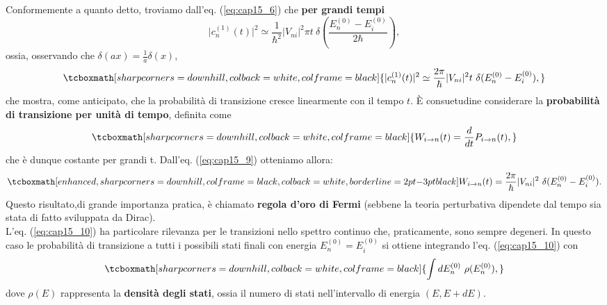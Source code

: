 Conformemente a quanto detto, troviamo dall'eq. (\ref{eq:cap15_6}) che \textbf{per grandi tempi}
	\begin{equation}
		\vert c_n ^{(1)} (t) \vert ^2 \simeq \frac{1}{\hbar ^2} \vert V_{ni} \vert ^2 \pi t\ \delta\left(\frac{E_n ^{(0)}-E_i ^{(0)}}{2\hbar} \right),
	\end{equation}
ossia, osservando che $\delta (ax) = \frac{1}{a} \delta (x)$,
	\begin{equation}
		\tcboxmath[sharp corners=downhill, colback=white, colframe=black]{
			\vert c_n ^{(1)} (t) \vert ^2 \simeq \frac{2\pi}{\hbar } \vert V_{ni} \vert ^2  t\ \delta (E_n ^{(0)}-E_i ^{(0)} ),
			}
	\label{eq:cap15_9}
	\end{equation}
che mostra, come anticipato, che la probabilità di transizione cresce linearmente con il tempo $t$. È consuetudine considerare la \textbf{probabilità di transizione per unità di tempo}, definita come
	\begin{equation}
		\tcboxmath[sharp corners=downhill, colback=white, colframe=black]{
			W_{i\rightarrow n} (t) =\frac{d}{dt} P_{i\rightarrow n} (t),
			}
	\end{equation}
che è dunque costante per grandi t. Dall'eq. (\ref{eq:cap15_9}) otteniamo allora:
	\begin{equation}
		\tcboxmath[enhanced, sharp corners=downhill, colframe=black, colback=white, borderline={2pt}{-3pt}{black}]{
			W_{i\rightarrow n} (t) = \frac{2\pi}{\hbar } \vert V_{ni} \vert ^2\ \delta (E_n ^{(0)}-E_i ^{(0)} ).
			}
	\label{eq:cap15_10}
	\end{equation}
Questo risultato,di grande importanza pratica, è chiamato \textbf{regola d'oro di Fermi} (sebbene la teoria perturbativa dipendete dal tempo sia stata di fatto sviluppata da Dirac).\\
		
L'eq. (\ref{eq:cap15_10}) ha particolare rilevanza per le transizioni nello spettro continuo che, praticamente, sono sempre degeneri. In questo caso le probabilità di transizione a tutti i possibili stati finali con energia $E_n ^{(0)}= E_i ^{(0)}$ si ottiene integrando l'eq. (\ref{eq:cap15_10}) con
	\begin{equation}
		\tcboxmath[sharp corners=downhill, colback=white, colframe=black]{
			\int dE_n ^{(0)} \ \rho (E_n ^{(0)}),
			}
	\end{equation}
dove $\rho (E)$ rappresenta la \textbf{densità degli stati}, ossia il numero di stati nell'intervallo di energia $(E, E+dE)$.
